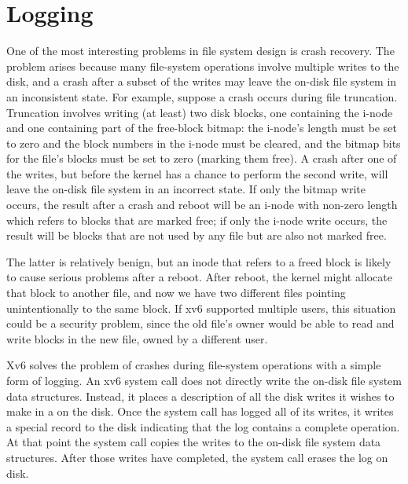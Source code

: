\chapter{Logging}
\label{CH:LOG}
% 
% 


One of the most interesting problems in file system design is crash
recovery. The problem arises because many file-system operations
involve multiple writes to the disk, and a crash after a subset of the
writes may leave the on-disk file system in an inconsistent state. For
example, suppose a crash occurs during file truncation.
Truncation involves writing (at least) two disk blocks,
one containing the i-node and one containing part of the free-block bitmap:
the i-node's length must be set to zero and the block
numbers in the i-node must be cleared,
and the bitmap bits for the file's blocks must
be set to zero (marking them free).
A crash after one of the writes, but before the kernel has
a chance to perform the second write, will leave the
on-disk file system in an incorrect state.
If only the bitmap write occurs, the result after a crash
and reboot will be an i-node with non-zero length which
refers to blocks that are marked free;
if only the i-node write occurs, the result will be
blocks that are not used by any file but are also not marked free.

The latter is relatively benign, but an inode that refers to a freed
block is likely to cause serious problems after a reboot.  After reboot, the
kernel might allocate that block to another file, and now we have two different
files pointing unintentionally to the same block.  If xv6 supported
multiple users, this situation could be a security problem, since the
old file's owner would be able to read and write blocks in the
new file, owned by a different user.

Xv6 solves the problem of crashes during file-system operations with a
simple form of logging. An xv6 system call does not directly write
the on-disk file system data structures. Instead, it places a
description of all the disk writes it wishes to make in a 
on the disk. Once the system call has logged all of its writes, it writes a
special 
record to the disk indicating that the log contains
a complete operation. At that point the system call copies the writes
to the on-disk file system data structures. After those writes have
completed, the system call erases the log on disk.


